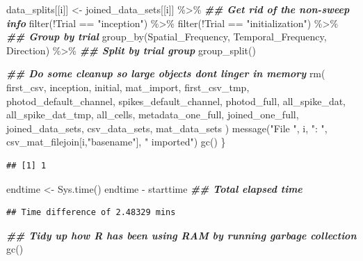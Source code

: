 \documentclass[
]{book}
\newenvironment{Shaded}{\begin{snugshade}}{\end{snugshade}}
\newcommand{\DocumentationTok}[1]{\textcolor[rgb]{0.56,0.35,0.01}{\textbf{\textit{#1}}}}
\newcommand{\FunctionTok}[1]{\textcolor[rgb]{0.00,0.00,0.00}{#1}}
\newcommand{\NormalTok}[1]{#1}
\newcommand{\OtherTok}[1]{\textcolor[rgb]{0.56,0.35,0.01}{#1}}
\newcommand{\SpecialCharTok}[1]{\textcolor[rgb]{0.00,0.00,0.00}{#1}}
\newcommand{\StringTok}[1]{\textcolor[rgb]{0.31,0.60,0.02}{#1}}
\begin{document}
\begin{Shaded}
\begin{Highlighting}[]
\NormalTok{  data\_splits[[i]] }\OtherTok{\textless{}{-}}
\NormalTok{    joined\_data\_sets[[i]] }\SpecialCharTok{\%\textgreater{}\%}
    \DocumentationTok{\#\# Get rid of the non{-}sweep info}
    \FunctionTok{filter}\NormalTok{(}\SpecialCharTok{!}\NormalTok{Trial }\SpecialCharTok{==} \StringTok{"inception"}\NormalTok{) }\SpecialCharTok{\%\textgreater{}\%}
    \FunctionTok{filter}\NormalTok{(}\SpecialCharTok{!}\NormalTok{Trial }\SpecialCharTok{==} \StringTok{"initialization"}\NormalTok{) }\SpecialCharTok{\%\textgreater{}\%}
    \DocumentationTok{\#\# Group by trial}
    \FunctionTok{group\_by}\NormalTok{(Spatial\_Frequency, Temporal\_Frequency, Direction) }\SpecialCharTok{\%\textgreater{}\%}
    \DocumentationTok{\#\# Split by trial group}
    \FunctionTok{group\_split}\NormalTok{()}

  \DocumentationTok{\#\# Do some cleanup so large objects don\textquotesingle{}t linger in memory}
  \FunctionTok{rm}\NormalTok{(}
\NormalTok{    first\_csv, inception, initial, mat\_import, first\_csv\_tmp,}
\NormalTok{    photod\_default\_channel, spikes\_default\_channel, photod\_full,}
\NormalTok{    all\_spike\_dat, all\_spike\_dat\_tmp, all\_cells,}
\NormalTok{    metadata\_one\_full, joined\_one\_full, joined\_data\_sets,}
\NormalTok{    csv\_data\_sets, mat\_data\_sets}
\NormalTok{  )}
  \FunctionTok{message}\NormalTok{(}\StringTok{"File "}\NormalTok{, i, }\StringTok{": "}\NormalTok{, csv\_mat\_filejoin[i,}\StringTok{"basename"}\NormalTok{], }\StringTok{" imported"}\NormalTok{)}
  \FunctionTok{gc}\NormalTok{()}
\NormalTok{\}}
\end{Highlighting}
\end{Shaded}

\begin{verbatim}
## [1] 1
\end{verbatim}

\begin{Shaded}
\begin{Highlighting}[]
\NormalTok{endtime }\OtherTok{\textless{}{-}} \FunctionTok{Sys.time}\NormalTok{()}
\NormalTok{endtime }\SpecialCharTok{{-}}\NormalTok{ starttime }\DocumentationTok{\#\# Total elapsed time}
\end{Highlighting}
\end{Shaded}

\begin{verbatim}
## Time difference of 2.48329 mins
\end{verbatim}

\begin{Shaded}
\begin{Highlighting}[]
\DocumentationTok{\#\# Tidy up how R has been using RAM by running garbage collection}
\FunctionTok{gc}\NormalTok{()}
\end{Highlighting}
\end{Shaded}
\end{document}
